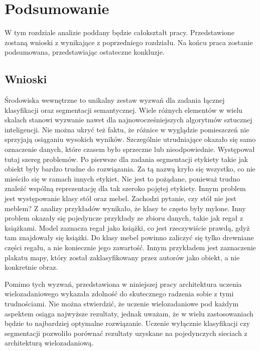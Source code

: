 \clearpage
\newpage %
\section{Podsumowanie}

W tym rozdziale analizie poddany będzie całokształt pracy. Przedstawione zostaną wnioski z wynikające z poprzedniego rozdziału. Na końcu praca zostanie podsumowana, przedstawiając ostateczne konkluzje.

\subsection{Wnioski}

Środowiska wewnętrzne to unikalny zestaw wyzwań dla zadania łącznej klasyfikacji oraz segmentacji semantycznej. Wiele różnych elementów w wielu skalach stanowi wyzwanie nawet dla najnowocześniejszych algorytmów sztucznej inteligencji. Nie można ukryć też faktu, że różnice w wyglądzie pomieszczeń nie sprzyjają osiąganiu wysokich wyników. Szczególnie utrudniające okazało się samo oznaczenie danych, które czasem było sprzeczne lub nieodpowiednie. Występował tutaj szereg problemów. Po pierwsze dla zadania segmentacji etykiety takie jak obiekt były bardzo trudne do rozwiązania. Za tą nazwą kryło się wszystko, co nie mieściło się w ramach innych etykiet. Nie jest to pożądane, ponieważ trudno znaleźć wspólną reprezentację dla tak szeroko pojętej etykiety. Innym problem jest występowanie klasy stół oraz mebel. Zachodzi pytanie, czy stół nie jest meblem? Z analizy przykładów wynikało, że klasy te często były mylone. Inny problem okazały się pojedyncze przykłady ze zbioru danych, takie jak regał z książkami. Model zaznacza regał jako książki, co jest rzeczywiście prawdą, gdyż tam znajdowały się książki. Do klasy mebel powinno zaliczyć się tylko drewniane części regału, a nie koniecznie jego zawartość. Innym przykładem jest zaznaczenie plakatu mapy, który został zaklasyfikowany przez autorów jako obiekt, a nie konkretnie obraz.

Pomimo tych wyzwań, przedstawiona w niniejszej pracy architektura uczenia wielozadaniowego wykazała zdolność do skutecznego radzenia sobie z tymi trudnościami. Nie można stwierdzić, że uczenie wielozadaniowe pod każdym aspektem osiąga najwyższe rezultaty, jednak uważam, że w wielu zastosowaniach będzie to najbardziej optymalne rozwiązanie. Uczenie wyłącznie klasyfikacji czy segmentacji pozwoliło porównać rezultaty uzyskane na pojedynczych sieciach z architekturą wielozadaniową.

